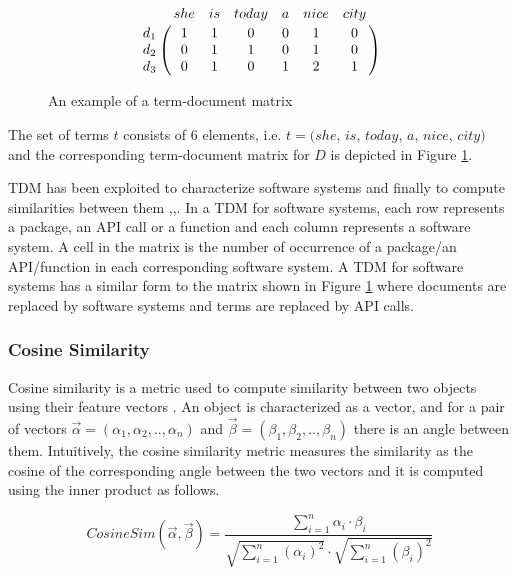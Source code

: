 \begin{figure}[h!]
	\begin{equation} \nonumber
	\bordermatrix{~ & she & is & today & a & nice & city \cr	
		d_{1} 		& 1 & 1 & 0 & 0 & 1 & 0 \cr 
		d_{2} 		& 0 & 1 & 1 & 0 & 1 & 0 \cr  
		d_{3} 		& 0 & 1 & 0 & 1 & 2 & 1 \cr }
	\end{equation}
	\caption{An example of a term-document matrix}
	\label{fig:TDM}
\end{figure}

The set of terms $t$ consists of $6$ elements, i.e. $t=(she$, $is$, $today$, $a$, $nice$, $city)$ and the corresponding term-document matrix for $D$ is depicted in Figure \ref{fig:TDM}.

TDM has been exploited to characterize software systems and finally to compute similarities between them \cite{10.1109/APSEC.2004.69},\cite{10.1109ICPC.2016.7503721},\cite{McMillan:2012:DSS:2337223.2337267}. In a TDM for software systems, each row represents a package, an API call or a function and each column represents a software system. A cell in the matrix is the number of occurrence of a package/an API/function in each corresponding software system. A TDM for software systems has a similar form to the matrix shown in Figure \ref{fig:TDM} where documents are replaced by software systems and terms are replaced by API calls.


\subsubsection{Cosine Similarity}

Cosine similarity is a metric used to compute similarity between two objects using their feature vectors \cite{tversky1977features}. An object is characterized as a vector, and for a pair of vectors $\vec{\alpha}=(\alpha_{1},\alpha_{2},..,\alpha_{n})$ and $\vec{\beta}=(\beta_{1},\beta_{2},..,\beta_{n})$ there is an angle between them. Intuitively, the cosine similarity metric measures the similarity as the cosine of the corresponding angle between the two vectors and it is computed using the inner product as follows. 

\begin{equation} \label{eqn:Cosine}
CosineSim(\vec{\alpha},\vec{\beta}) = \frac{\sum_{i=1}^{n}\alpha_{i}\cdot \beta_{i}}{\sqrt{\sum_{i=1}^{n}(\alpha_{i})^{2} }\cdot \sqrt{\sum_{i=1}^{n}(\beta_{i})^{2}}}
\end{equation}

